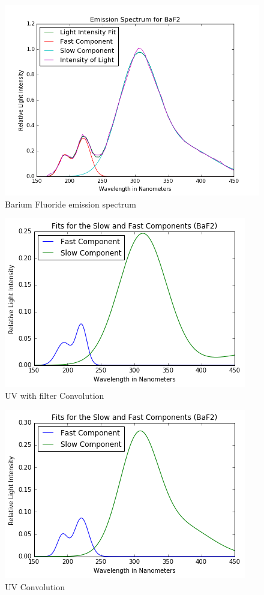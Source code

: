 \documentclass[aip, jmp, amsmath, amssymb, reprint, floatfix]{revtex4-1}
\begin{document}
\begin{figure}
  \centering
    \includegraphics[width=.8\columnwidth]{FitsBaF2.png}
  \caption{Barium Fluoride emission spectrum}
  \label{fig:FitsBaF2}
\end{figure} 

\begin{figure}
  \centering
    \includegraphics[width=.8\columnwidth]{convf.png}
  \caption{UV with filter Convolution}
  \label{fig:convf}
\end{figure} 

\begin{figure}
  \centering
    \includegraphics[width=.8\columnwidth]{convuv.png}
  \caption{UV Convolution}
  \label{fig:convuv}
\end{figure} 
\end{document}
